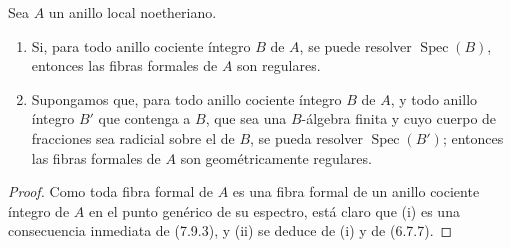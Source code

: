 \begin{corollary}[7.9.4]
\label{IV.2.s7.9.4-fr}
Sea $A$ un anillo local noetheriano.
\begin{enumerate}
\item[\emph{(i)}] Si, para todo anillo cociente íntegro $B$ de $A$, se puede
resolver $\operatorname{Spec}(B)$, entonces las fibras formales de $A$ son
regulares.
\item[\emph{(ii)}] Supongamos que, para todo anillo cociente íntegro $B$ de
$A$, y todo anillo íntegro $B'$ que contenga a $B$, que sea una $B$-álgebra finita
y cuyo cuerpo de fracciones sea radicial sobre el de $B$, se pueda
resolver $\operatorname{Spec}(B')$; entonces las fibras formales de $A$ son
geométricamente regulares.
\end{enumerate}
\end{corollary}

\begin{proof}
Como toda fibra formal de $A$ es una fibra formal de un anillo cociente íntegro
de $A$ en el punto genérico de su espectro, está claro que (i) es una consecuencia
inmediata de (7.9.3), y (ii) se deduce de (i) y de (6.7.7).
\end{proof}
